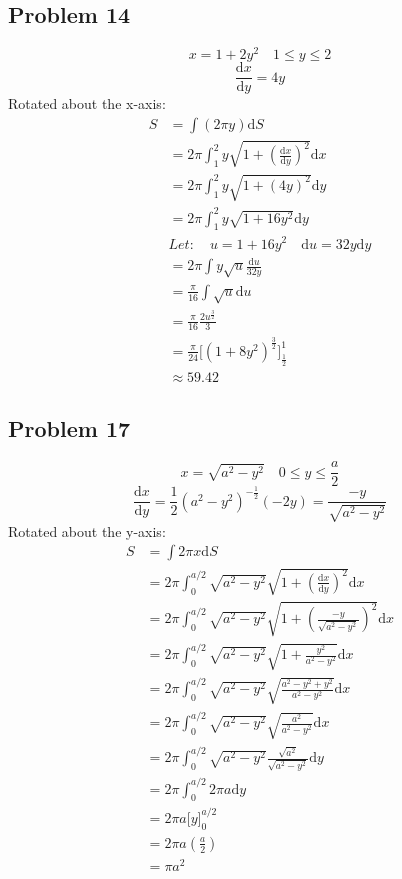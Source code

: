 \documentclass[letterpaper, 12pt]{article}
\newcommand*{\diff}{\mathrm{d}}
\begin{document}
\subsection*{Problem 14}
\[ x = 1+2y^{2} \quad 1 \leq y \leq 2 \]
\[ \frac{\diff{x}}{\diff{y}} = 4y \]
Rotated about the x-axis:
\begin{align*}
  S &= \int(2\pi y)\diff{S} \\
  &= 2\pi\int_{1}^{2}{ y\sqrt{1+(\frac{\diff{x}}{\diff{y}})^{2}}\diff{x}} \\
  &= 2\pi\int_{1}^{2}{y\sqrt{1+(4y)^{2}}\diff{y}} \\
  &= 2\pi\int_{1}^{2}{y\sqrt{1+16y^{2}}\diff{y}} \\
  & Let: \quad u = 1+16y^{2} \quad \diff{u} = 32y\diff{y} \\
  &= 2\pi\int{y\sqrt{u}\frac{\diff{u}}{32y}} \\
  &= \frac{\pi}{16}\int{\sqrt{u}\diff{u}} \\
  &= \frac{\pi}{16}\frac{2u^{\frac{3}{2}}}{3} \\
  &= \frac{\pi}{24}\bigg[(1+8y^{2})^{\frac{3}{2}}\bigg]_{\frac{1}{2}}^{1} \\
  & \approx 59.42
\end{align*}

\subsection*{Problem 17}
\[ x = \sqrt{a^{2}-y^{2}} \quad 0 \leq y \leq \frac{a}{2} \]
\[ \frac{\diff{x}}{\diff{y}} = \frac{1}{2}(a^{2}-y^{2})^{-\frac{1}{2}}(-2y)
   = \frac{-y}{\sqrt{a^{2}-y^{2}}} \]
Rotated about the y-axis:
\begin{align*}
  S &= \int{2\pi x\diff{S}} \\
  &= 2\pi\int_{0}^{a/2}{
    \sqrt{a^{2}-y^{2}}\sqrt{1+(\frac{\diff{x}}{\diff{y}})^{2}}\diff{x}} \\
  &= 2\pi\int_{0}^{a/2}{
    \sqrt{a^{2}-y^{2}}\sqrt{1+(\frac{-y}{\sqrt{a^{2}-y^{2}}})^{2}}\diff{x}} \\
  &= 2\pi\int_{0}^{a/2}{
    \sqrt{a^{2}-y^{2}}\sqrt{1+\frac{y^{2}}{a^{2}-y^{2}}}\diff{x}} \\
  &= 2\pi\int_{0}^{a/2}{
    \sqrt{a^{2}-y^{2}}\sqrt{\frac{a^{2}-y^{2}+y^{2}}{a^{2}-y^{2}}}\diff{x}} \\
  &= 2\pi\int_{0}^{a/2}{
    \sqrt{a^{2}-y^{2}}\sqrt{\frac{a^{2}}{a^{2}-y^{2}}}\diff{x}} \\
  &= 2\pi\int_{0}^{a/2}{
    \sqrt{a^{2}-y^{2}}\frac{\sqrt{a^{2}}}{\sqrt{a^{2}-y^{2}}}\diff{y}} \\
  &= 2\pi\int_{0}^{a/2}{2\pi a\diff{y}} \\
  &= 2\pi a\bigg[y\bigg]_{0}^{a/2} \\
  &= 2\pi a(\frac{a}{2}) \\
  &= \pi a^{2}
\end{align*}
\end{document}
